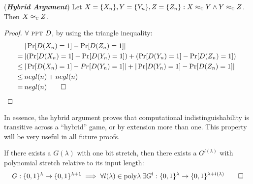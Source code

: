 \begin{lemma} \label{lem:hybrid}
    (\textbf{\textit{Hybrid Argument}}) Let $X = \{X_n\}, Y = \{Y_n\}, Z = \{Z_n\} : X \approx_\textsc{c} Y \wedge Y \approx_\textsc{c} Z$. Then $X \approx_\textsc{c} Z$. 
\end{lemma}
\begin{proof}
    $\forall \textsc{ ppt } D$, by using the triangle inequality:
    \begin{align*}
        &|\Pr[D(X_n) = 1] - \Pr[D(Z_n) = 1]| \\
        =\:& |(\Pr[D(X_n) = 1] - \Pr[D(Y_n) = 1]) + (\Pr[D(Y_n) = 1] - \Pr[D(Z_n) = 1])| \\
        \leq\:& |\Pr[D(X_n) = 1] - Pr[D(Y_n) = 1]| + |\Pr[D(Y_n) = 1] - \Pr[D(Z_n) = 1]| \\
        \leq\:& negl(n) + negl(n) \\
        =\:& negl(n) \qedhere
    \end{align*}
\end{proof}

In essence, the hybrid argument proves that computational indistinguishability is transitive across a ``hybrid'' game, or by extension more than one. This property will be very useful in all future proofs.

\begin{theorem}
    If there exists a \prg{} $G(\lambda)$ with one bit stretch, then there exists a \prg{} $G^{l(\lambda)}$ with polynomial stretch relative to its input length:
    \begin{equation*}
        G:\{0,1\}^{\lambda} \to \{0,1\}^{\lambda + 1} \implies \forall l(\lambda) \in \mathrm{poly}{\lambda} \:\exists G^l:\{0,1\}^{\lambda} \to \{0,1\}^{\lambda + l(\lambda)} \qedhere
    \end{equation*} 
\end{theorem}

